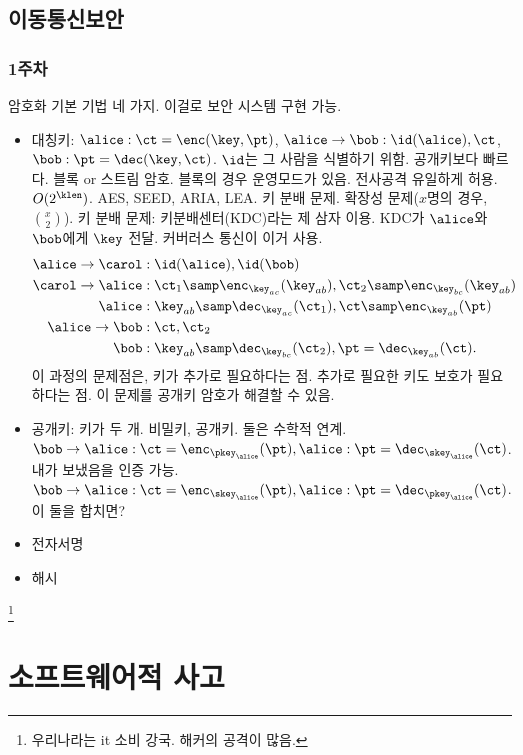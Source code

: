 \section{이동통신보안}

\subsection*{1주차}

암호화 기본 기법 네 가지. 이걸로 보안 시스템 구현 가능.
\begin{itemize}
  \item 대칭키: $\alice: \ct = \enc(\key, \pt)$, $\alice \to \bob: \id(\alice), 
        \ct$, $\bob: \pt = \dec(\key, \ct)$. $\id$는 그 사람을 식별하기 위함. 
        공개키보다 빠르다. 블록 or 스트림 암호.
        블록의 경우 운영모드가 있음. 전사공격 유일하게 허용. $O(2^{\klen})$. 
        AES, SEED, ARIA, LEA. 키 분배 문제. 확장성 문제($x$명의 경우, $\binom{x}{2}$).
        키 분배 문제: 키분배센터(KDC)라는 제 삼자 이용. KDC가 $\alice$와 $\bob$에게 $\key$
        전달. 커버러스 통신이 이거 사용.
        \begin{equation}
          \begin{split}
            \alice \to \carol&: \id(\alice), \id(\bob) \\
            \carol \to \alice&: \ct_1 \samp \enc_{\key_{ac}}(\key_{ab}), 
            \ct_2 \samp \enc_{\key_{bc}}(\key_{ab}) \\
            \alice&: \key_{ab} \samp \dec_{\key_{ac}}(\ct_1), 
            \ct \samp \enc_{\key_{ab}}(\pt) \\
            \alice \to \bob&: \ct, \ct_2 \\
            \bob&: \key_{ab} \samp \dec_{\key_{bc}}(\ct_2), 
            \pt = \dec_{\key_{ab}}(\ct).
          \end{split}
        \end{equation}
        이 과정의 문제점은, 키가 추가로 필요하다는 점. 추가로 필요한 키도 보호가 필요하다는 점.
        이 문제를 공개키 암호가 해결할 수 있음.
  \item 공개키: 키가 두 개. 비밀키, 공개키. 둘은 수학적 연계.
        $\bob \to \alice: \ct = \enc_{\pkey_{\alice}}(\pt), 
        \alice: \pt = \dec_{\skey_{\alice}}(\ct)$.
        내가 보냈음을 인증 가능.  
        $\bob \to \alice: \ct = \enc_{\skey_{\alice}}(\pt), 
        \alice: \pt = \dec_{\pkey_{\alice}}(\ct)$.
        이 둘을 합치면? 
  \item 전자서명
  \item 해시
\end{itemize}


\footnote{우리나라는 it 소비 강국. 해커의 공격이 많음.}

\chapter{소프트웨어적 사고}
